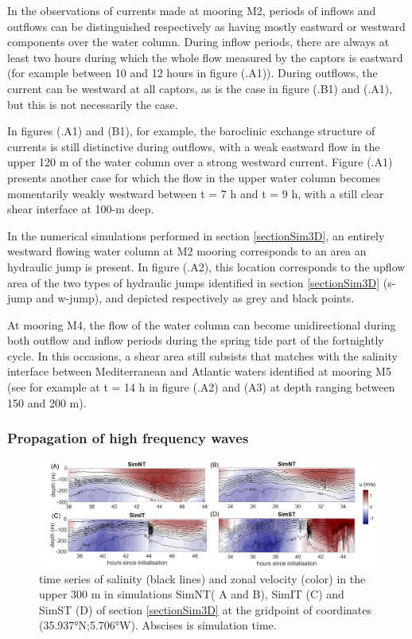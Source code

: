 In the observations of currents made at mooring M2, periods of inflows and outflows can be distinguished respectively as having mostly eastward or westward components over the water column. During inflow periods, there are always at least two hours during which the whole flow measured by the captors is eastward (for example between 10 and 12 hours in figure (.A1)). During outflows, the current can be westward at all captors, as is the case in figure (.B1) and (.A1), but this is not necessarily the case. 

In figures (.A1) and (B1), for example, the baroclinic exchange structure of currents is still distinctive during outflows, with a weak eastward flow in the upper 120 m of the water column over a strong westward current. Figure (.A1) presents another case for which the flow in the upper water column becomes momentarily weakly westward between t = 7 h and t = 9 h, with a still clear shear interface at 100-m deep.

In the numerical simulations performed in section \ref{sectionSim3D}, an entirely westward flowing water column at M2 mooring corresponds to an area an hydraulic jump is present. In figure (.A2), this location corresponds to the upflow area of the two types of hydraulic jumps identified in section \ref{sectionSim3D} (s-jump and w-jump), and depicted respectively as grey and black points.

At mooring M4, the flow of the water column can become unidirectional during both outflow and inflow periods during the spring tide part of the fortnightly cycle. In this occasions, a shear area still subsists that matches with the salinity interface between Mediterranean and Atlantic waters identified at mooring M5 (see for example at t = 14 h in figure (.A2) and (A3) at depth ranging between 150 and 200 m).

\subsubsection{Propagation of high frequency waves}

\begin{figure}[!h]
 \includegraphics[width=\textwidth]{./GBR3D/US_M4SimMIV.png}
 \caption {time series of salinity (black lines) and zonal velocity (color) in the upper 300 m in simulations SimNT( A and B), SimIT (C) and SimST (D) of section \ref{sectionSim3D} at the gridpoint of coordinates (35.937°N;5.706°W). Abscises is simulation time. }
 \label{Fig_moor_USs}
\end{figure}


